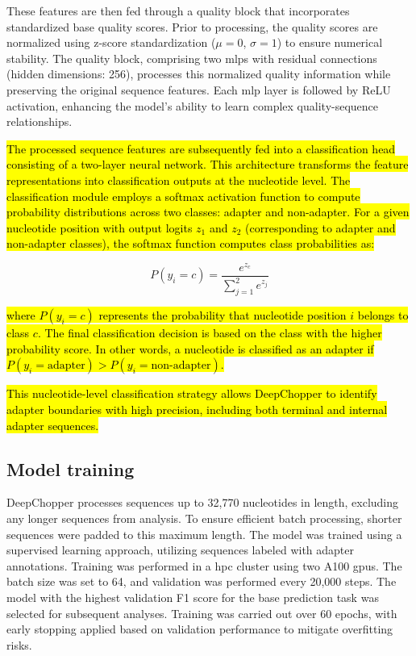 \documentclass[pdflatex,sn-nature, lineno]{sn-jnl}%
\begin{document}
These features are then fed through a quality block that incorporates standardized base quality scores.
Prior to processing, the quality scores are normalized using z-score standardization ($\mu=0$, $\sigma=1$) to ensure numerical stability.
The quality block, comprising two \glspl{mlp} with residual connections (hidden dimensions: 256), processes this normalized quality information while preserving the original sequence features.
Each \gls{mlp} layer is followed by ReLU activation, enhancing the model's ability to learn complex quality-sequence relationships.

\hl{The processed sequence features are subsequently fed into a classification head consisting of a two-layer neural network. This architecture transforms the feature representations into classification outputs at the nucleotide level. The classification module employs a softmax activation function to compute probability distributions across two classes: adapter and non-adapter.
	For a given nucleotide position with output logits $z_1$ and $z_2$ (corresponding to adapter and non-adapter classes), the softmax function computes class probabilities as:}

\[ P(y_i=c) = \frac{e^{z_c}}{\sum_{j=1}^{2} e^{z_j}} \]

\hl{where $P(y_i=c)$ represents the probability that nucleotide position $i$ belongs to class $c$.
	The final classification decision is based on the class with the higher probability score.
	In other words, a nucleotide is classified as an adapter if $P(y_i = \textrm{adapter}) > P(y_i = \textrm{non-adapter})$.}

\hl{This nucleotide-level classification strategy allows DeepChopper to identify adapter boundaries with high precision, including both terminal and internal adapter sequences.}

\subsection{Model training}\label{ssec:training}


DeepChopper processes sequences up to 32,770 nucleotides in length, excluding any longer sequences from analysis.
To ensure efficient batch processing, shorter sequences were padded to this maximum length.
The model was trained using a supervised learning approach, utilizing sequences labeled with adapter annotations.
Training was performed in a \gls{hpc} cluster using two A100 \glspl{gpu}.
The batch size was set to 64, and validation was performed every 20,000 steps.
The model with the highest validation F1 score for the base prediction task was selected for subsequent analyses.
Training was carried out over \num{60} epochs, with early stopping applied based on validation performance to mitigate overfitting risks.
\end{document}
